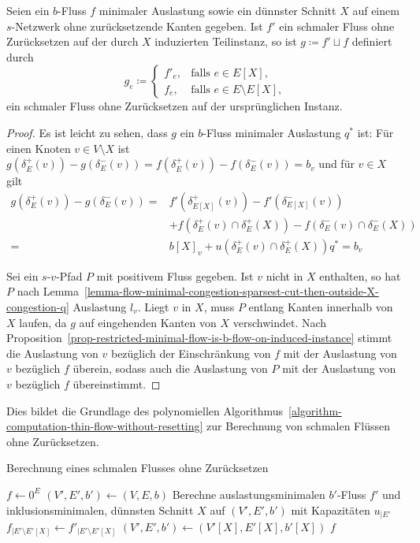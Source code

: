 \begin{corollary}\label{cor-thin-flow-alg-correct}
	Seien ein $b$-Fluss $f$ minimaler Auslastung sowie ein dünnster Schnitt $X$ auf einem $s$-Netzwerk ohne zurücksetzende Kanten gegeben.
	Ist $f'$ ein schmaler Fluss ohne Zurücksetzen auf der durch $X$ induzierten Teilinstanz, so ist $g \coloneq f' \sqcup f$ definiert durch \[
		g_e \coloneq \begin{cases}
			f'_e, & \text{falls $e\in E[X]$,} \\
			f_e, & \text{falls $e\in E\setminus E[X]$,}
		\end{cases}
	\] ein schmaler Fluss ohne Zurücksetzen auf der ursprünglichen Instanz.
\end{corollary}
\begin{proof}
	Es ist leicht zu sehen, dass $g$ ein $b$-Fluss minimaler Auslastung $q^*$ ist:
	Für einen Knoten $v \in V\setminus X$ ist $g(\delta^+_E(v)) - g(\delta^-_E(v)) = f(\delta^+_E(v)) - f(\delta^-_E(v)) = b_v$ und für $v\in X$ gilt
	\begin{align*}
	g(\delta^+_E(v)) - g(\delta^-_E(v)) =& f'(\delta^+_{E[X]}(v)) - f'(\delta^-_{E[X]}(v)) \\
	&+ f(\delta^+_E(v)\cap\delta^+_E(X)) - f(\delta^-_E(v)\cap\delta^-_E(X))
	\\=& b[X]_v + u(\delta^+_E(v)\cap\delta^+_E(X)) q^* = b_v
	\end{align*}

	Sei ein $s$-$v$-Pfad $P$ mit positivem Fluss gegeben.
	Ist $v$ nicht in $X$ enthalten, so hat $P$ nach Lemma~\ref{lemma-flow-minimal-congestion-sparsest-cut-then-outside-X-congestion-q} Auslastung $l_v$.
	Liegt $v$ in $X$, muss $P$ entlang Kanten innerhalb von $X$ laufen, da $g$ auf eingehenden Kanten von $X$ verschwindet.
	Nach Proposition~\ref{prop-restricted-minimal-flow-is-b-flow-on-induced-instance} stimmt die Auslastung von $v$ bezüglich der Einschränkung von $f$ mit der Auslastung von $v$ bezüglich $f$ überein, sodass auch die Auslastung von $P$ mit der Auslastung von $v$ bezüglich $f$ übereinstimmt.
\end{proof}

Dies bildet die Grundlage des polynomiellen Algorithmus~\ref{algorithm-computation-thin-flow-without-resetting} zur Berechnung von schmalen Flüssen ohne Zurücksetzen.

\begin{algorithm}
\caption{Berechnung eines schmalen Flusses ohne Zurücksetzen}
\label{algorithm-computation-thin-flow-without-resetting}
\begin{algorithmic}[1]
	\State $f \gets 0^E$
	\State $(V', E', b') \gets (V, E, b)$
	\State Berechne auslastungsminimalen $b'$-Fluss $f'$ und inklusionsminimalen, 
	\Statex  dünnsten Schnitt $X$ auf $(V', E', b')$ mit Kapazitäten $u_{\mid E'}$
	\State $f_{\mid E'\setminus E'[X]} \gets f'_{\mid E'\setminus E'[X]}$
	\State $(V', E', b') \gets (V'[X], E'[X], b'[X])$
	\EndWhile
	\State\Return $f$
	\EndProcedure
\end{algorithmic}
\end{algorithm}

